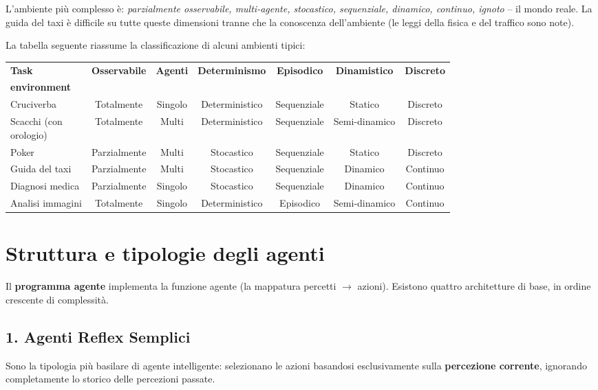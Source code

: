 \begin{notebox}
L'ambiente più complesso è: \emph{parzialmente osservabile, multi-agente, stocastico, sequenziale, dinamico, continuo, ignoto} -- il mondo reale. La guida del taxi è difficile su tutte queste dimensioni tranne che la conoscenza dell'ambiente (le leggi della fisica e del traffico sono note).
\end{notebox}

La tabella seguente riassume la classificazione di alcuni ambienti tipici:

\begin{center}
\small
\renewcommand{\arraystretch}{1.3}
\begin{tabular}{@{} l c c c c c c @{}}
\toprule
\textbf{Task} & \textbf{Osservabile} & \textbf{Agenti} & \textbf{Determinismo} & \textbf{Episodico} & \textbf{Dinamistico} & \textbf{Discreto} \\
\textbf{environment} & & & & & & \\
\midrule
Cruciverba & Totalmente & Singolo & Deterministico & Sequenziale & Statico & Discreto \\
\parbox{2.2cm}{\centering Scacchi (con\\ orologio)} & Totalmente & Multi & Deterministico & Sequenziale & Semi-dinamico & Discreto \\
Poker & Parzialmente & Multi & Stocastico & Sequenziale & Statico & Discreto \\
Guida del taxi & Parzialmente & Multi & Stocastico & Sequenziale & Dinamico & Continuo \\
Diagnosi medica & Parzialmente & Singolo & Stocastico & Sequenziale & Dinamico & Continuo \\
Analisi immagini & Totalmente & Singolo & Deterministico & Episodico & Semi-dinamico & Continuo \\
\bottomrule
\end{tabular}
\normalsize
\end{center}


\section{Struttura e tipologie degli agenti}
Il \textbf{programma agente} implementa la funzione agente (la mappatura percetti $\to$ azioni). Esistono quattro architetture di base, in ordine crescente di complessità.


\subsection{1. Agenti Reflex Semplici}
Sono la tipologia più basilare di agente intelligente: selezionano le azioni basandosi esclusivamente sulla \textbf{percezione corrente}, ignorando completamente lo storico delle percezioni passate.

